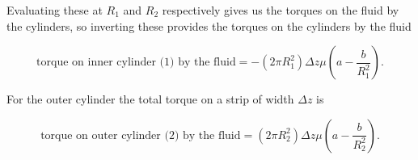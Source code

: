 Evaluating these at $R_1$ and $R_2$ respectively gives us the torques on the fluid by the cylinders, so inverting these provides the torques on the cylinders by the fluid

\begin{equation}\label{eqn:couetteFlow:1270}
\text{torque on inner cylinder (1) by the fluid} = -(2 \pi R_1^2) \Delta z \mu \left( a - \frac{b}{R_1^2} \right).
\end{equation}

For the outer cylinder the total torque on a strip of width $\Delta z$ is

\begin{equation}\label{eqn:couetteFlow:1290}
\text{torque on outer cylinder (2) by the fluid} = (2 \pi R_2^2) \Delta z \mu \left( a - \frac{b}{R_2^2} \right).
\end{equation}

\EndArticle
